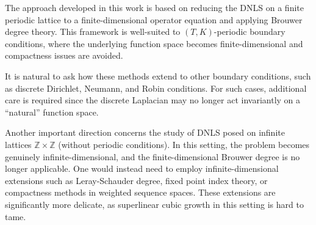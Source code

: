 \documentclass[12 pt,twoside]{amsart}
\numberwithin{equation}{section}
\theoremstyle{definition}
\theoremstyle{remark}
\begin{document}
The approach developed in this work is based on reducing the DNLS on a finite periodic lattice to a finite-dimensional operator equation and applying Brouwer degree theory. This framework is well-suited to $(T,K)$-periodic boundary conditions, where the underlying function space becomes finite-dimensional and compactness issues are avoided.

It is natural to ask how these methods extend to other boundary conditions, such as discrete Dirichlet, Neumann, and Robin conditions. For such cases, additional care is required since the discrete Laplacian may no longer act invariantly on a ``natural'' function space. 

Another important direction concerns the study of DNLS posed on infinite lattices $\mathbb{Z}\times\mathbb{Z}$ (without periodic conditions). In this setting, the problem becomes genuinely infinite-dimensional, and the finite-dimensional Brouwer degree is no longer applicable. One would instead need to employ infinite-dimensional extensions such as Leray-Schauder degree, fixed point index theory, or compactness methods in weighted sequence spaces. These extensions are significantly more delicate, as superlinear cubic growth in this setting is hard to tame.
\end{document}

